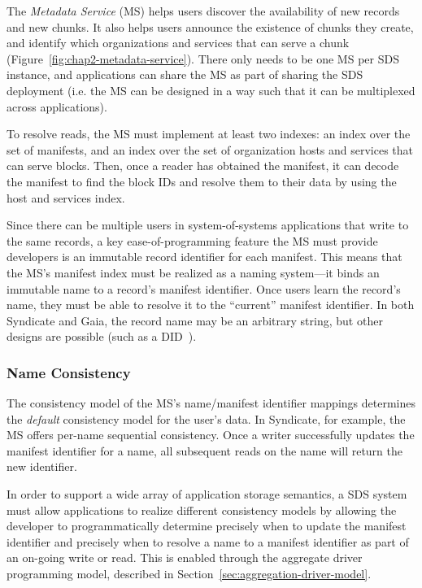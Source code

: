 The \emph{Metadata Service} (MS) helps users discover the
availability of new records and new chunks.  It also helps users
announce the existence of chunks they create, and
identify which organizations and services that can serve a chunk
(Figure~\ref{fig:chap2-metadata-service}).
There only needs to be one MS per SDS instance, and
applications can share the MS as part of sharing the SDS deployment (i.e. the MS
can be designed in a way such that it can be multiplexed across applications).

To resolve reads, the MS must implement at least two indexes:
an index over the set of manifests, and an index over the set of organization
hosts and services that can serve blocks.  Then, once a reader has obtained the
manifest, it can decode the manifest to find the block IDs and resolve them to
their data by using the host and services index.

Since there can be multiple users in system-of-systems applications that write
to the same records, a key ease-of-programming
feature the MS must provide developers is an immutable record identifier
for each manifest.  This means that the MS's manifest index must be realized as
a naming system---it binds an immutable name to a record's manifest identifier.
Once users learn the record's name, they must be able to resolve it to the
``current'' manifest identifier.  In both Syndicate and Gaia, the record
name may be an arbitrary string, but other designs are possible (such as a
DID~\cite{decentralized-identifiers}).

\subsubsection{Name Consistency}

The consistency model of the MS's name/manifest identifier mappings determines the \emph{default}
consistency model for the user's data.
In Syndicate, for example, the MS offers
per-name sequential consistency.  Once a writer successfully updates the manifest
identifier for a name, all subsequent reads on the name will return the new
identifier.

In order to support a wide array of application storage semantics, a
SDS system must allow applications to realize different consistency
models by allowing the developer to programmatically determine precisely
when to update the manifest identifier and precisely when to resolve a name to a
manifest identifier as part of an on-going write or read.
This is enabled through the aggregate driver programming model,
described in Section~\ref{sec:aggregation-driver-model}.

